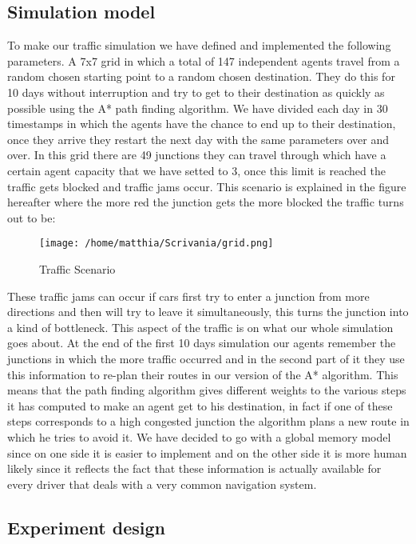 \documentclass[a4paper,hidelinks]{article}
\begin{document}
\subsection{Simulation model}
To make our traffic simulation we have defined and implemented the following parameters. A 7x7 grid in which a total of 147 independent agents travel from a random chosen starting point to a random chosen destination. They do this for 10 days without interruption and try to get to their destination as quickly as possible using the A* path finding algorithm. We have divided each day in 30 timestamps in which the agents have the chance to end up to their destination, once they arrive they restart the next day with the same parameters over and over. In this grid there are 49 junctions they can travel through which have a certain agent capacity that we have setted to 3, once this limit is reached the traffic gets blocked and traffic jams occur. This scenario is explained in the figure hereafter where the more red the junction gets the more blocked the traffic turns out to be:

\begin{figure}[ht!]
\centering
\texttt{[image: /home/matthia/Scrivania/grid.png]}
\caption{Traffic Scenario \label{overflow}}
\end{figure} 


These traffic jams can occur if cars first try to enter a junction from more directions and then will try to leave it simultaneously, this turns the junction into a kind of bottleneck. This aspect of the traffic is on what our whole simulation goes about. At the end of the first 10 days simulation our agents remember the junctions in which the more traffic occurred and in the second part of it they use this information to re-plan their routes in our version of the A* algorithm. This means that the path finding algorithm gives different weights to the various steps it has computed to make an agent get to his destination, in fact if one of these steps corresponds to a high congested junction the algorithm plans a new route in which he tries to avoid it. We have decided to go with a global memory model since on one side it is easier to implement and on the other side it is more human likely since it reflects the fact that these information is actually available for every driver that deals with a very common navigation system. 

\subsection{Experiment design}
\end{document}
